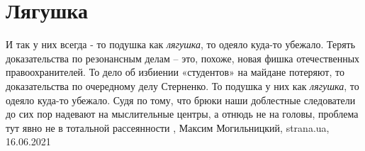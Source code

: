  
 
 
 
 
\chapter{Лягушка}

И так у них всегда - то подушка как \emph{лягушка}, то одеяло куда-то убежало.
Терять доказательства по резонансным делам – это, похоже, новая фишка
отечественных правоохранителей. То дело об избиении «студентов» на майдане
потеряют, то доказательства по очередному делу Стерненко. То подушка у них как
\emph{лягушка}, то одеяло куда-то убежало.  Судя по тому, что брюки наши
доблестные следователи до сих пор надевают на мыслительные центры, а отнюдь не
на головы, проблема тут явно не в тотальной рассеянности
, 
Максим Могильницкий, strana.ua, 16.06.2021
